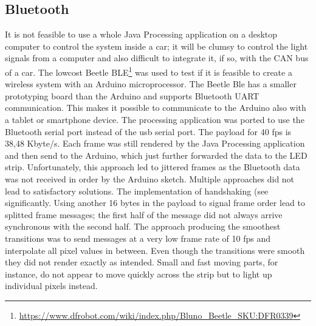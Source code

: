 \subsection{Bluetooth}
\label{ssec:bluettoth}
It is not feasible to use a whole Java Processing application on a desktop computer to control the system inside a car; it will be clumsy to control the light signals from a computer and also difficult to integrate it, if so, with the CAN bus of a car. The lowcost Beetle BLE\footnote{\url{https://www.dfrobot.com/wiki/index.php/Bluno_Beetle_SKU:DFR0339}} was used to test if it is feasible to create a wireless system with an Arduino microprocessor. The Beetle Ble has a smaller prototyping board than the Arduino and supports Bluetooth UART communication. This makes it possible to communicate to the Arduino also with a tablet or smartphone device. The processing application was ported to use the Bluetooth serial port instead of the usb serial port. The payload for 40 fps is 38,48 Kbyte/s.
Each frame was still rendered by the Java Processing application and then send to the Arduino, which just further forwarded the data to the LED strip. Unfortunately, this approach led to jittered frames as the Bluetooth data was not received in order by the Arduino sketch. Multiple approaches did not lead to satisfactory solutions. The implementation of handshaking (see \emph{} significantly. Using another 16 bytes in the payload to signal frame order lead to splitted frame messages; the first half of the message did not always arrive synchronous with the second half. The approach producing the smoothest transitions was to send messages at a very low frame rate of 10 fps and interpolate all pixel values in between. Even though the transitions were smooth they did not render exactly as intended. Small and fast moving parts, for instance, do not appear to move quickly across the strip but to light up individual pixels instead. 

